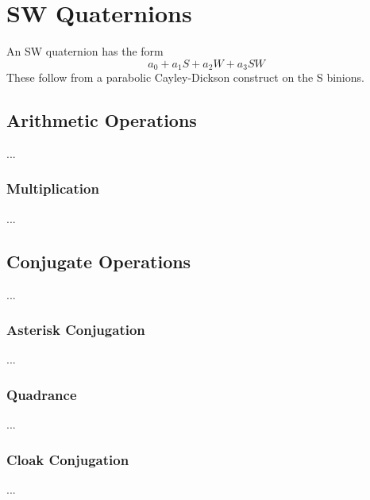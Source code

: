 \chapter{SW Quaternions}
An SW quaternion has the form
\begin{equation}
    a_{0} + a_{1} S + a_{2} W + a_{3} SW
\end{equation}
These follow from a parabolic Cayley-Dickson construct on the S binions.
\section{Arithmetic Operations}
...
\subsection{Multiplication}
...
\section{Conjugate Operations}
...
\subsection{Asterisk Conjugation}
...
\subsection{Quadrance}
...
\subsection{Cloak Conjugation}
...
